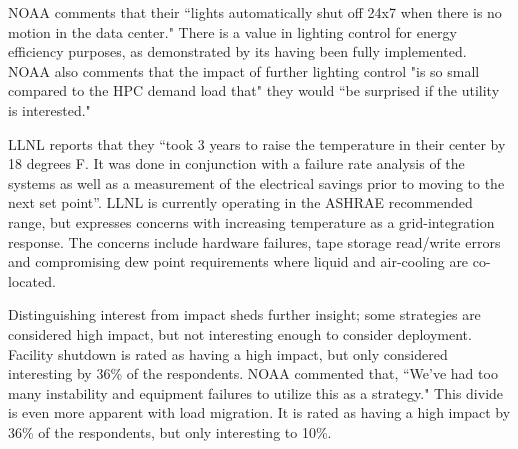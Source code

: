 NOAA comments that their ``lights automatically shut off 24x7 
when there is no motion in the data center." There is a value in lighting control for 
energy efficiency purposes, as demonstrated by its having been fully implemented. NOAA also comments that
the impact of further lighting control "is so small compared to the HPC demand load that" they would ``be surprised 
if the utility is interested." 

LLNL reports that they ``took 3 years to raise the temperature in their center by 18 degrees F. 
It was done in conjunction with a failure rate analysis of the systems as well as a measurement of the 
electrical savings prior to moving to the next set point”. LLNL is currently operating in the ASHRAE 
recommended range, but expresses concerns with increasing temperature as a grid-integration response. The 
concerns include hardware failures, 
tape storage read/write errors and compromising dew point requirements where liquid and air-cooling are co-located.

Distinguishing interest from impact sheds further insight; some strategies are 
considered high impact, but not interesting enough to consider deployment. Facility
shutdown is rated as having a high impact, but only
considered interesting by 36\% of the respondents. NOAA commented that, ``We've had too many instability and equipment failures to utilize this as a strategy." This divide is even more
apparent with load migration. It is rated as having a high impact by 36\% of the
respondents, but only interesting to 10\%. 